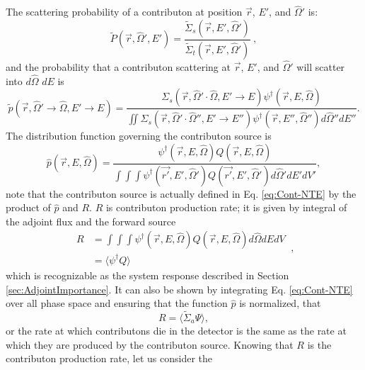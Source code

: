 The scattering probability of a contributon at position $\vec{r}$, $E'$, and
$\hat\Omega'$ is:
\begin{equation}
\widetilde{P}(\vec{r}, \hat\Omega',E') =
         \frac{\widetilde{\Sigma}_{ s }(\vec{r}, E', \hat\Omega')}
       {\widetilde{\Sigma}_{ t }(\vec{r}, E', \hat\Omega')} \:,
\end{equation}
and the probability that a contributon scattering at $\vec{r}$, $E'$,
and $\hat\Omega'$ will scatter into $d\hat\Omega$ $dE$ is
\begin{equation}
\widetilde{p}(\vec{r}, \hat\Omega'\rightarrow\hat\Omega, E' \rightarrow E) =
       \frac{\Sigma_{s}(\vec{r}, \hat\Omega'\cdot\hat\Omega, E'\rightarrow E)
       \psi^{\dagger} (\vec{r}, E, \hat\Omega)}
       {\iint \Sigma_{s}(\vec{r},\hat\Omega'\cdot\hat\Omega'',E'\rightarrow
       E'')\psi^{\dagger} (\vec{r}, E'', \hat\Omega'')d\hat\Omega'' dE''}.
\end{equation}
The distribution function governing the contributon source is
\begin{equation}
\hat p(\vec{r}, E, \hat\Omega) =
\frac{\psi^{\dagger}(\vec{r}, E, \hat\Omega) Q(\vec{r},E,\hat\Omega)}
     {\int \int \int \psi^{\dagger}(\vec{r'},E',\hat\Omega')
     Q(\vec{r'},E',\hat\Omega') d\hat\Omega' dE' dV'},
\end{equation}
note that the contributon source is actually defined in Eq.
\eqref{eq:Cont-NTE} by the product of $\hat{p}$
and $R$. $R$ is contributon production rate; it
is given by integral of the adjoint flux and the forward source
\begin{equation}
  \begin{split}
R &= \int \int \int \psi^{\dagger}(\vec{r},E,\hat\Omega)Q(\vec{r},E,\hat\Omega)
    d\hat\Omega dE dV \\
  & = \langle \psi^{\dagger}Q  \rangle
\end{split} \:,
\end{equation}
which is recognizable as the system response described
in Section \ref{sec:AdjointImportance}. It can also be shown by integrating Eq.
\eqref{eq:Cont-NTE} over all phase space and ensuring that the function
$\hat{p}$ is normalized, that
\begin{equation}
  R = \langle \widetilde{\Sigma}_a \Psi \rangle,
  \label{eq:contribprod}
\end{equation}
or the rate at which contributons die in the detector is the same as
the rate at which they are produced by the contributon source.
Knowing that $R$ is the contributon production rate, let us consider the
